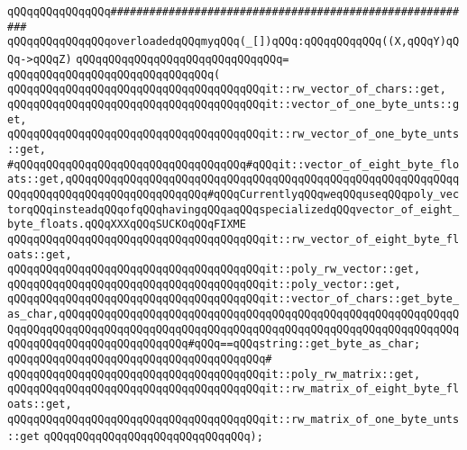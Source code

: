 \verb|qQQqqQQqqQQqqQQq#########################################################|\newline
\newline
\newline
\verb|qQQqqQQqqQQqqQQqoverloadedqQQqmyqQQq(_[])qQQq:qQQqqQQqqQQq((X,qQQqY)qQQq->qQQqZ)|\newline
\verb|qQQqqQQqqQQqqQQqqQQqqQQqqQQqqQQq=|\newline
\verb|qQQqqQQqqQQqqQQqqQQqqQQqqQQqqQQq(|\newline
\verb|qQQqqQQqqQQqqQQqqQQqqQQqqQQqqQQqqQQqqQQqit::rw_vector_of_chars::get,|\newline
\verb|qQQqqQQqqQQqqQQqqQQqqQQqqQQqqQQqqQQqqQQqit::vector_of_one_byte_unts::get,|\newline
\verb|qQQqqQQqqQQqqQQqqQQqqQQqqQQqqQQqqQQqqQQqit::rw_vector_of_one_byte_unts::get,|\newline
\verb|#qQQqqQQqqQQqqQQqqQQqqQQqqQQqqQQqqQQq#qQQqit::vector_of_eight_byte_floats::get,qQQqqQQqqQQqqQQqqQQqqQQqqQQqqQQqqQQqqQQqqQQqqQQqqQQqqQQqqQQqqQQqqQQqqQQqqQQqqQQqqQQqqQQqqQQq#qQQqCurrentlyqQQqweqQQquseqQQqpoly_vectorqQQqinsteadqQQqofqQQqhavingqQQqaqQQqspecializedqQQqvector_of_eight_byte_floats.qQQqXXXqQQqSUCKOqQQqFIXME|\newline
\verb|qQQqqQQqqQQqqQQqqQQqqQQqqQQqqQQqqQQqqQQqit::rw_vector_of_eight_byte_floats::get,|\newline
\verb|qQQqqQQqqQQqqQQqqQQqqQQqqQQqqQQqqQQqqQQqit::poly_rw_vector::get,|\newline
\verb|qQQqqQQqqQQqqQQqqQQqqQQqqQQqqQQqqQQqqQQqit::poly_vector::get,|\newline
\verb|qQQqqQQqqQQqqQQqqQQqqQQqqQQqqQQqqQQqqQQqit::vector_of_chars::get_byte_as_char,qQQqqQQqqQQqqQQqqQQqqQQqqQQqqQQqqQQqqQQqqQQqqQQqqQQqqQQqqQQqqQQqqQQqqQQqqQQqqQQqqQQqqQQqqQQqqQQqqQQqqQQqqQQqqQQqqQQqqQQqqQQqqQQqqQQqqQQqqQQqqQQqqQQqqQQqqQQqqQQq#qQQq==qQQqstring::get_byte_as_char;|\newline
\verb|qQQqqQQqqQQqqQQqqQQqqQQqqQQqqQQqqQQqqQQq#|\newline
\verb|qQQqqQQqqQQqqQQqqQQqqQQqqQQqqQQqqQQqqQQqit::poly_rw_matrix::get,|\newline
\verb|qQQqqQQqqQQqqQQqqQQqqQQqqQQqqQQqqQQqqQQqit::rw_matrix_of_eight_byte_floats::get,|\newline
\verb|qQQqqQQqqQQqqQQqqQQqqQQqqQQqqQQqqQQqqQQqit::rw_matrix_of_one_byte_unts::get|\newline
\verb|qQQqqQQqqQQqqQQqqQQqqQQqqQQqqQQq);|\newline
\newline
